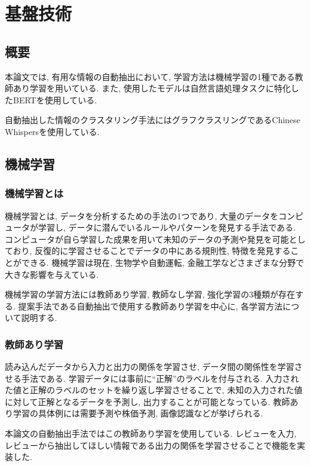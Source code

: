 \chapter{基盤技術}
\label{chap:kibangijyutu}



\section{概要}
本論文では, 有用な情報の自動抽出において, 学習方法は機械学習の1種である教師あり学習を用いている. 
また, 使用したモデルは自然言語処理タスクに特化したBERTを使用している. 

自動抽出した情報のクラスタリング手法にはグラフクラスリングであるChinese Whispersを使用している. 


\section{機械学習}
\subsection{機械学習とは}
機械学習とは, データを分析するための手法の1つであり, 大量のデータをコンピュータが学習し, データに潜んでいるルールやパターンを発見する手法である. コンピュータが自ら学習した成果を用いて未知のデータの予測や発見を可能としており, 反復的に学習させることでデータの中にある規則性, 特徴を発見することができる. 機械学習は現在, 生物学や自動運転, 金融工学などさまざまな分野で大きな影響を与えている. 

機械学習の学習方法には教師あり学習, 教師なし学習, 強化学習の3種類が存在する. 提案手法である自動抽出で使用する教師あり学習を中心に, 各学習方法について説明する. 

\subsection{教師あり学習}
読み込んだデータから入力と出力の関係を学習させ, データ間の関係性を学習させる手法である. 学習データには事前に``正解''のラベルを付与される. 
入力された値と正解のラベルのセットを繰り返し学習させることで, 未知の入力された値に対して正解となるデータを予測し, 出力することが可能となっている. 
教師あり学習の具体例には需要予測や株価予測, 画像認識などが挙げられる. 

本論文の自動抽出手法ではこの教師あり学習を使用している. レビューを入力, レビューから抽出してほしい情報である出力の関係を学習させることで機能を実装した.

